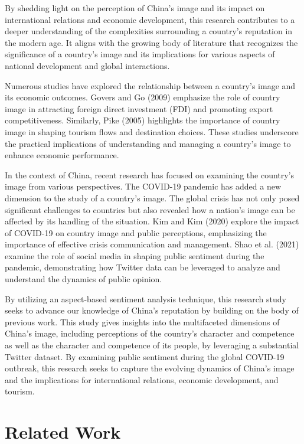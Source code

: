 \documentclass[conference]{IEEEtran}
\begin{document}
By shedding light on the perception of China's image and its impact on international relations and economic development, this research contributes to a deeper understanding of the complexities surrounding a country's reputation in the modern age. It aligns with the growing body of literature that recognizes the significance of a country's image and its implications for various aspects of national development and global interactions. 

Numerous studies have explored the relationship between a country's image and its economic outcomes. Govers and Go (2009) emphasize the role of country image in attracting foreign direct investment (FDI) and promoting export competitiveness. Similarly, Pike (2005) highlights the importance of country image in shaping tourism flows and destination choices. These studies underscore the practical implications of understanding and managing a country's image to enhance economic performance. 


In the context of China, recent research has focused on examining the country's image from various perspectives. The COVID-19 pandemic has added a new dimension to the study of a country's image. The global crisis has not only posed significant challenges to countries but also revealed how a nation's image can be affected by its handling of the situation. Kim and Kim (2020) explore the impact of COVID-19 on country image and public perceptions, emphasizing the importance of effective crisis communication and management. Shao et al. (2021) examine the role of social media in shaping public sentiment during the pandemic, demonstrating how Twitter data can be leveraged to analyze and understand the dynamics of public opinion. 
 
By utilizing an aspect-based sentiment analysis technique, this research study seeks to advance our knowledge of China's reputation by building on the body of previous work. This study gives insights into the multifaceted dimensions of China's image, including perceptions of the country's character and competence as well as the character and competence of its people, by leveraging a substantial Twitter dataset. By examining public sentiment during the global COVID-19 outbreak, this research seeks to capture the evolving dynamics of China's image and the implications for international relations, economic development, and tourism. 

\section{Related Work}
\end{document}
